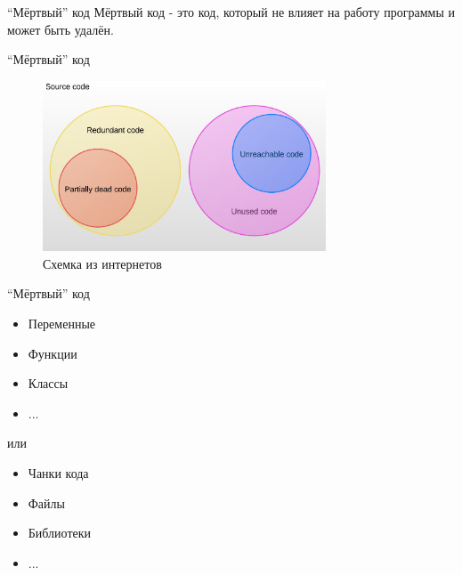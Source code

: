 \documentclass[aspectratio=169]{beamer}
\begin{document}
\begin{frame}{``Мёртвый'' код}
    Мёртвый код - это код, который не влияет на работу программы и может быть удалён.
\end{frame}

\begin{frame}{``Мёртвый'' код}
    \begin{figure}
        \includegraphics[width=0.75\textwidth]{memes/dead_code_scheme.jpg}
        \caption{Схемка из интернетов}
    \end{figure}
\end{frame}

\begin{frame}{``Мёртвый'' код}

    \begin{itemize}
        \item Переменные
        \item Функции
        \item Классы
        \item ...
    \end{itemize}
    или
    \begin{itemize}
        \item Чанки кода
        \item Файлы
        \item Библиотеки
        \item ...
    \end{itemize}
\end{frame}
\end{document}
